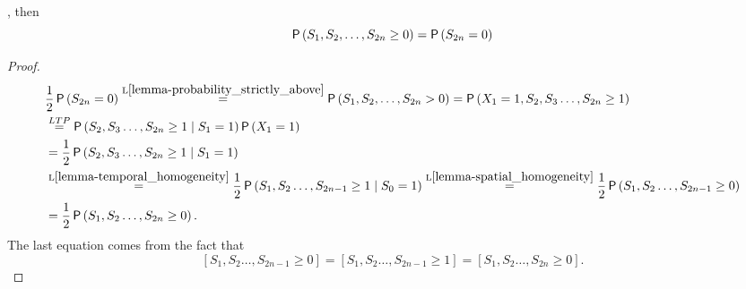 \begin{comment}
\begin{thm}[Probability of no return and return]\label{thm-no_return=return}
 \Lrws. The following equation holds:
 \[\pr \left( S_1, S_2, \ldots, S_{2n}\neq 0 \right)
 =\pr \left( S_{2n}=0 \right).
 \]
\end{thm}
\begin{proof}
 The event $[S_1, S_2, \ldots, S_{2n}\neq 0]$ is the union of two disjoint events:
 $[S_1, S_2, \ldots, S_{2n}\neq 0]=[S_1, S_2, \ldots, S_{2n} < 0]\cup [S_1, S_2, \ldots, S_{2n} > 0]$.

 By previous theorem (L\ref{thm-no_return=return}) we get that the probability
 of both terms is $\h u_{2n}$.
 Because the the events are disjoint we can sum their probabilities and we get the desired result.
\end{proof}
\end{comment}
\begin{lemma}\label{lemma-probability_above_or_on}
  \Lrws, then
 \[
 \operatorname{\mathsf{P}} \left( S_1, S_2, \ldots, S_{2n} \geq 0 \right)
 =\operatorname{\mathsf{P}} \left( S_{2n}=0 \right)
 \]
\end{lemma}
\begin{proof}
\[
  \begin{split}
    & \frac{1}{2} \operatorname{\mathsf{P}}\left(S_{2n}=0 \right)\overset{\text{L}\ref{lemma-probability_strictly_above}}{=}\operatorname{\mathsf{P}} \left( S_1, S_2, \ldots, S_{2n}>0 \right)
    =\operatorname{\mathsf{P}} \left( X_1=1, S_2, S_3 \ldots, S_{2n}\geq 1 \right)\\
    & \overset{LTP}{=} \operatorname{\mathsf{P}} \left(S_2, S_3 \ldots, S_{2n}\geq 1 \;\middle\vert\; S_1=1\right) \operatorname{\mathsf{P}} \left(X_1=1 \right)\\
    &=\frac{1}{2} \operatorname{\mathsf{P}} \left( S_2, S_3 \ldots, S_{2n}\geq 1 \mid S_1=1 \right)\\
    & \overset{\text{L}\ref{lemma-temporal_homogeneity}}{=}\frac{1}{2} \operatorname{\mathsf{P}} \left( S_1, S_2 \ldots, S_{2n-1}\geq 1 \mid S_0=1 \right)
    \overset{\text{L}\ref{lemma-spatial_homogeneity}}{=}\frac{1}{2} \operatorname{\mathsf{P}} \left( S_1, S_2 \ldots, S_{2n-1}\geq 0 \right)\\
    & =\frac{1}{2} \operatorname{\mathsf{P}} \left( S_1, S_2 \ldots, S_{2n}\geq 0 \right).
  \end{split}
 \]
 The last equation comes from the fact that
 \[
 [S_1, S_2 \ldots, S_{2n-1}\geq 0 ]=[S_1, S_2 \ldots, S_{2n-1}\geq 1]=[S_1, S_2 \ldots, S_{2n} \geq 0 ].
 \]
\end{proof}

